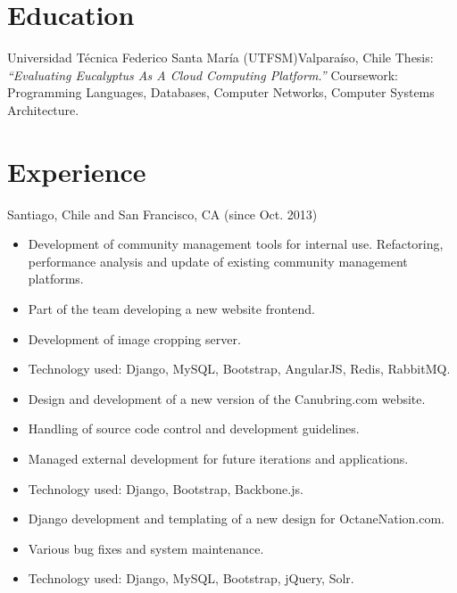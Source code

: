\documentclass[sans,letter]{moderncv}
\begin{document}
\maketitle


\section{Education}

{Universidad Técnica Federico Santa María (UTFSM)}{Valparaíso, Chile}{
Thesis: \em ``Evaluating Eucalyptus As A Cloud Computing Platform.''
}{
Coursework: Programming Languages, Databases, Computer Networks, Computer Systems Architecture.
}


\section{Experience}

{Santiago, Chile and San Francisco, CA (since Oct. 2013)}{}
{\begin{itemize}
  \item Development of community management tools for internal use.
  Refactoring, performance analysis and update of existing community
  management platforms.
  \item Part of the team developing a new website frontend.
  \item Development of image cropping server.
  \item Technology used: Django, MySQL, Bootstrap, AngularJS, Redis, RabbitMQ.
\end{itemize}}

{\begin{itemize}
  \item Design and development of a new version of the Canubring.com website.
  \item Handling of source code control and development guidelines.
  \item Managed external development for future iterations and
  applications.
  \item Technology used: Django, Bootstrap, Backbone.js.
\end{itemize}}

{\begin{itemize}
  \item Django development and templating of a new design for OctaneNation.com.
  \item Various bug fixes and system maintenance.
  \item Technology used: Django, MySQL, Bootstrap, jQuery, Solr.
\end{itemize}}
\end{document}
